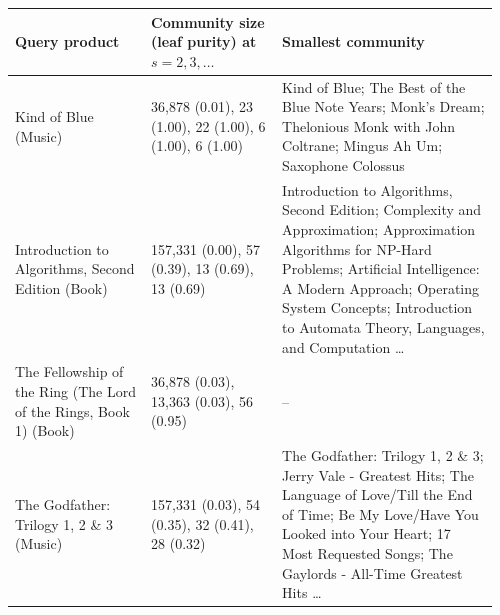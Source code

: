 \begin{tabular}{@{}p{0.27\linewidth}p{0.26\linewidth}p{0.43\linewidth}@{}}
\toprule
Query product & Community size (leaf purity) at $s=2,3,\dots$ & Smallest community \\
\midrule
Kind of Blue (Music) & 36,878 (0.01), 23 (1.00), 22 (1.00), 6 (1.00), 6 (1.00) & Kind of Blue; The Best of the Blue Note Years; Monk's Dream; Thelonious Monk with John Coltrane; Mingus Ah Um; Saxophone Colossus \\
Introduction to Algorithms, Second Edition (Book) & 157,331 (0.00), 57 (0.39), 13 (0.69), 13 (0.69) & Introduction to Algorithms, Second Edition; Complexity and Approximation; Approximation Algorithms for NP-Hard Problems; Artificial Intelligence: A Modern Approach; Operating System Concepts; Introduction to Automata Theory, Languages, and Computation \dots \\
The Fellowship of the Ring (The Lord of the Rings, Book 1) (Book) & 36,878 (0.03), 13,363 (0.03), 56 (0.95) & -- \\
The Godfather: Trilogy 1, 2 \& 3 (Music) & 157,331 (0.03), 54 (0.35), 32 (0.41), 28 (0.32) & The Godfather: Trilogy 1, 2 \& 3; Jerry Vale - Greatest Hits; The Language of Love/Till the End of Time; Be My Love/Have You Looked into Your Heart; 17 Most Requested Songs; The Gaylords - All-Time Greatest Hits \dots \\
\bottomrule
\end{tabular}
